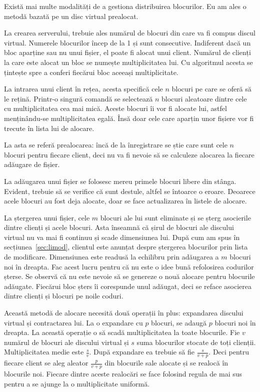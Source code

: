\documentclass[a4wide,12pt]{report}
\newcommand{\acr}[1]{{\textsmaller[1]{\textsc{#1}}}} %
\begin{document}
Există mai multe modalități de a gestiona distribuirea blocurilor. Eu am ales o metodă bazată pe un disc virtual
prealocat.

La crearea serverului, trebuie ales numărul de blocuri din care va fi compus discul virtual. Numerele blocurilor încep
de la 1 și sunt consecutive. Indiferent dacă un bloc aparține sau nu unui fișier, el poate fi alocat unui client.
Numărul de clienți la care este alocat un bloc se numește multiplicitatea lui. Cu algoritmul acesta se țintește spre a
conferi fiecărui bloc aceeași multiplicitate.

La intrarea unui client în rețea, acesta specifică cele $n$ blocuri pe care se oferă să le rețină. Printr-o singură
comandă \acr{SQL} se selectează $n$ blocuri aleatoare dintre cele cu multiplicitatea cea mai mică. Aceste blocuri îi vor
fi alocate lui, astfel menținându-se multiplicitatea egală. Însă doar cele care aparțin unor fișiere vor fi trecute în
lista lui de alocare.

La asta se referă prealocarea: încă de la înregistrare se știe care sunt cele $n$ blocuri pentru fiecare client, deci nu
va fi nevoie să se calculeze alocarea la fiecare adăugare de fișier.

La adăugarea unui fișier se folosesc mereu primele blocuri libere din stânga. Evident, trebuie să se verifice că sunt
destule, altfel se întoarce o eroare. Deoarece acele blocuri au fost deja alocate, doar se face actualizarea în listele
de alocare.

La ștergerea unui fișier, cele $m$ blocuri ale lui sunt eliminate și se șterg asocierile dintre clienți și acele
blocuri. Asta înseamnă că șirul de blocuri ale discului virtual nu va mai fi continuu și scade dimensiunea lui. După cum
am spus în secțiunea~\ref{sec:limod}, clientul este anunțat despre ștergerea blocurilor prin lista de modificare.
Dimensiunea este readusă la echilibru prin adăugarea a $m$ blocuri noi în dreapta. Fac acest lucru pentru că nu este o
idee bună refolosirea codurilor șterse. Se observă că nu este nevoie să se genereze o nouă alocare pentru blocurile
adăugate. Fiecărui bloc șters îi corespunde unul adăugat, deci se reface asocierea dintre clienți și blocuri pe noile
coduri. 

Această metodă de alocare necesită două operații în plus: expandarea discului virtual și contractarea lui. La o
expandare cu $p$ blocuri, se adaugă $p$ blocuri noi în dreapta. La această operație o să scadă multiplicitatea la toate
blocurile. Fie $v$ numărul de blocuri ale discului virtual și $s$ suma blocurilor stocate de toți clienții.
Multiplicitatea medie este $\frac{s}{v}$. După expandare ea trebuie să fie $\frac{s}{v+p}$. Deci pentru fiecare client
se aleg aleator $\frac{p}{v+p}$ din blocurile sale alocate și se realocă în blocurile noi. Fiecare dintre aceste
realocări se face folosind regula de mai sus pentru a se ajunge la o multiplicitate uniformă.
\end{document}
